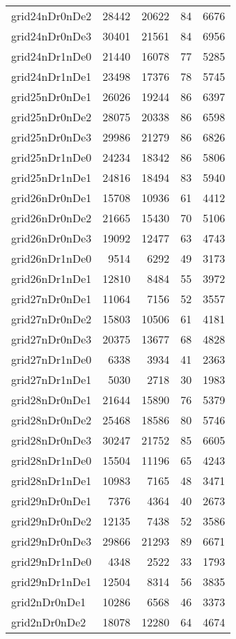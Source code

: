 \begin{tabular}{lrrrr}
grid24nDr0nDe2 & 28442 & 20622 & 84 & 6676 \\
grid24nDr0nDe3 & 30401 & 21561 & 84 & 6956 \\
grid24nDr1nDe0 & 21440 & 16078 & 77 & 5285 \\
grid24nDr1nDe1 & 23498 & 17376 & 78 & 5745 \\
grid25nDr0nDe1 & 26026 & 19244 & 86 & 6397 \\
grid25nDr0nDe2 & 28075 & 20338 & 86 & 6598 \\
grid25nDr0nDe3 & 29986 & 21279 & 86 & 6826 \\
grid25nDr1nDe0 & 24234 & 18342 & 86 & 5806 \\
grid25nDr1nDe1 & 24816 & 18494 & 83 & 5940 \\
grid26nDr0nDe1 & 15708 & 10936 & 61 & 4412 \\
grid26nDr0nDe2 & 21665 & 15430 & 70 & 5106 \\
grid26nDr0nDe3 & 19092 & 12477 & 63 & 4743 \\
grid26nDr1nDe0 & 9514 & 6292 & 49 & 3173 \\
grid26nDr1nDe1 & 12810 & 8484 & 55 & 3972 \\
grid27nDr0nDe1 & 11064 & 7156 & 52 & 3557 \\
grid27nDr0nDe2 & 15803 & 10506 & 61 & 4181 \\
grid27nDr0nDe3 & 20375 & 13677 & 68 & 4828 \\
grid27nDr1nDe0 & 6338 & 3934 & 41 & 2363 \\
grid27nDr1nDe1 & 5030 & 2718 & 30 & 1983 \\
grid28nDr0nDe1 & 21644 & 15890 & 76 & 5379 \\
grid28nDr0nDe2 & 25468 & 18586 & 80 & 5746 \\
grid28nDr0nDe3 & 30247 & 21752 & 85 & 6605 \\
grid28nDr1nDe0 & 15504 & 11196 & 65 & 4243 \\
grid28nDr1nDe1 & 10983 & 7165 & 48 & 3471 \\
grid29nDr0nDe1 & 7376 & 4364 & 40 & 2673 \\
grid29nDr0nDe2 & 12135 & 7438 & 52 & 3586 \\
grid29nDr0nDe3 & 29866 & 21293 & 89 & 6671 \\
grid29nDr1nDe0 & 4348 & 2522 & 33 & 1793 \\
grid29nDr1nDe1 & 12504 & 8314 & 56 & 3835 \\
grid2nDr0nDe1 & 10286 & 6568 & 46 & 3373 \\
grid2nDr0nDe2 & 18078 & 12280 & 64 & 4674 \\

\end{tabular}
